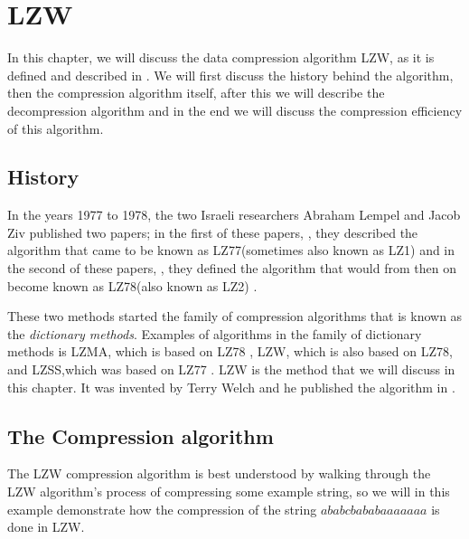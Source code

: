 \begin{comment}
  
\end{comment}

\chapter{LZW}
\label{cha:lzw}

In this chapter, we will discuss the data compression algorithm LZW,
as it is defined and described in
\cite{Nelson:1989:LDC:77102.77104,Welch:1984:THD:1319729.1320134,Salomon:2004:DCC,mark1996data_compression_book,nelson:_lzw_revis}. We
will first discuss the history behind the algorithm, then the
compression algorithm itself, after this we will describe the
decompression algorithm and in the end we will discuss the compression
efficiency of this algorithm.

\section{History}
\label{sec:hist-lzw}

In the years 1977 to 1978, the two Israeli researchers Abraham Lempel
and Jacob Ziv published two papers; in the first of these papers,
\cite{Ziv77auniversal}, they described the algorithm that came to be
known as LZ77(sometimes also known as LZ1) and in the second of these
papers, \cite{Ziv78compressionof}, they defined the algorithm that
would from then on become known as LZ78(also known as LZ2)
\cite{roelofs09:_histor_portab_networ_graph_png_format,Salomon:2004:DCC,winters:_us_paten_adapt}.

These two methods started the family of compression algorithms that is
known as the \textit{dictionary methods}. Examples of algorithms in the family of dictionary methods
is LZMA, which is based on LZ78 \cite{palov11}, LZW, which is also
based on LZ78, and LZSS,which was based on LZ77
\cite{Salomon:2004:DCC}. LZW is the method that we will discuss in
this chapter. It was invented by Terry Welch and he published the
algorithm in \cite{welch85:_u}.

\section{The Compression algorithm}
\label{sec:lzw-comp-desc}

The LZW compression algorithm is best
understood by walking through the LZW algorithm's process of
compressing some example string, so we will in this example
demonstrate how the compression of the string
$ababcbababaaaaaaa$ is done in LZW.

